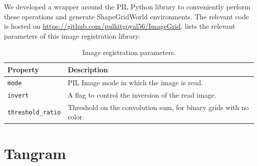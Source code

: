 \vspace{10pt}
We developed a wrapper around the PIL Python library \citep{pil} to conveniently perform these operations and generate ShapeGridWorld environments.
The relevant code is hosted on \url{https://github.com/pulkitgoyal56/ImageGrid}.
 lists the relevant parameters of this image registration library.
\begin{table}[h]
    \centering
    \begin{tabularx}{\textwidth}{C{3.9cm} L}
        \hline
        Property & Description\\
        \hline
        \texttt{mode} & PIL Image mode in which the image is read.\\
        \texttt{invert} & A flag to control the inversion of the read image. \\
        \texttt{threshold\_ratio} & Threshold on the convolution sum, for binary grids with no color.\\
        \hline
    \end{tabularx}
    \caption{Image registration parameters.}
    \label{tab:imagelib-params}
\end{table}


\newpage
\section{Tangram}
\label{sec:tangram-details}

